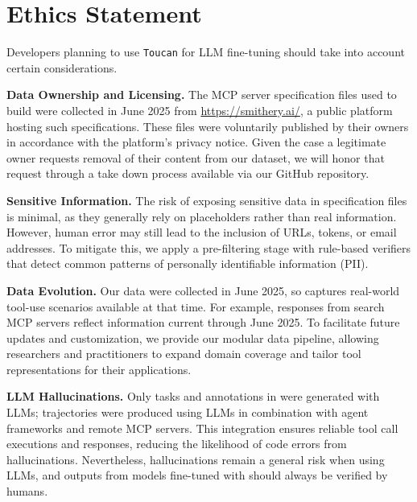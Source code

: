 \section{Ethics Statement}

Developers planning to use \texttt{Toucan} for LLM fine-tuning should take into account certain considerations.

\textbf{Data Ownership and Licensing.} The MCP server specification files used to build \dataname were collected in June 2025 from \url{https://smithery.ai/}, a public platform hosting such specifications. These files were voluntarily published by their owners in accordance with the platform's privacy notice. Given the case a legitimate owner requests removal of their content from our dataset, we will honor that request through a take down process available via our GitHub repository.

\textbf{Sensitive Information.} The risk of exposing sensitive data in specification files is minimal, as they generally rely on placeholders rather than real information. However, human error may still lead to the inclusion of URLs, tokens, or email addresses. To mitigate this, we apply a pre-filtering stage with rule-based verifiers that detect common patterns of personally identifiable information (PII).  

\textbf{Data Evolution.} Our data were collected in June 2025, so \dataname captures real-world tool-use scenarios available at that time. For example, responses from search MCP servers reflect information current through June 2025. To facilitate future updates and customization, we provide our modular data pipeline, allowing researchers and practitioners to expand domain coverage and tailor tool representations for their applications.

\textbf{LLM Hallucinations.} Only tasks and annotations in \dataname were generated with LLMs; trajectories were produced using LLMs in combination with agent frameworks and remote MCP servers. This integration ensures reliable tool call executions and responses, reducing the likelihood of code errors from hallucinations. Nevertheless, hallucinations remain a general risk when using LLMs, and outputs from models fine-tuned with \dataname should always be verified by humans. 
